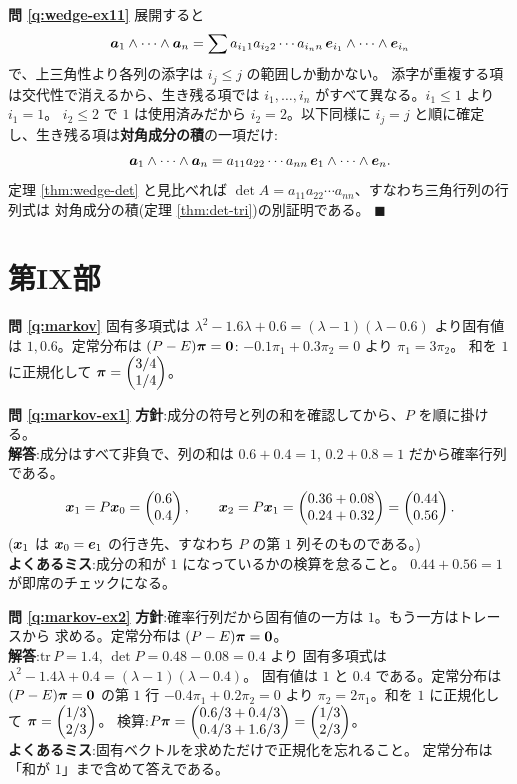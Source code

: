 \bigskip
\noindent\textbf{問 \ref{q:wedge-ex11}}\quad
展開すると
\[
\bm{a}_1 \wedge \cdots \wedge \bm{a}_n
= \sum a_{i_1 1} a_{i_2 2} \cdots a_{i_n n}\,
\bm{e}_{i_1} \wedge \cdots \wedge \bm{e}_{i_n}
\]
で、上三角性より各列の添字は $i_j \le j$ の範囲しか動かない。
添字が重複する項は交代性で消えるから、生き残る項では
$i_1, \dots, i_n$ がすべて異なる。$i_1 \le 1$ より $i_1 = 1$。
$i_2 \le 2$ で $1$ は使用済みだから $i_2 = 2$。以下同様に
$i_j = j$ と順に確定し、生き残る項は\textbf{対角成分の積}の一項だけ:
\[
\bm{a}_1 \wedge \cdots \wedge \bm{a}_n
= a_{11}a_{22}\cdots a_{nn}\,\bm{e}_1 \wedge \cdots \wedge \bm{e}_n.
\]
定理 \ref{thm:wedge-det} と見比べれば
$\det A = a_{11}a_{22}\cdots a_{nn}$、すなわち三角行列の行列式は
対角成分の積(定理 \ref{thm:det-tri})の別証明である。 $\blacksquare$

\section*{第IX部}

\noindent\textbf{問 \ref{q:markov}}\quad
固有多項式は $\lambda^2 - 1.6\lambda + 0.6 = (\lambda - 1)(\lambda - 0.6)$
より固有値は $1, 0.6$。定常分布は $(P - E)\bm{\pi} = \bm{0}$:
$-0.1\pi_1 + 0.3\pi_2 = 0$ より $\pi_1 = 3\pi_2$。
和を $1$ に正規化して $\bm{\pi} = \begin{pmatrix}3/4 \\ 1/4\end{pmatrix}$。

\bigskip
\noindent\textbf{問 \ref{q:markov-ex1}}\quad
\textbf{方針}:成分の符号と列の和を確認してから、$P$ を順に掛ける。\\
\textbf{解答}:成分はすべて非負で、列の和は $0.6 + 0.4 = 1$,
$0.2 + 0.8 = 1$ だから確率行列である。
\[
\bm{x}_1 = P\bm{x}_0 = \begin{pmatrix}0.6 \\ 0.4\end{pmatrix}, \qquad
\bm{x}_2 = P\bm{x}_1
= \begin{pmatrix}0.36 + 0.08 \\ 0.24 + 0.32\end{pmatrix} = \begin{pmatrix}0.44 \\ 0.56\end{pmatrix}.
\]
($\bm{x}_1$ は $\bm{x}_0 = \bm{e}_1$ の行き先、すなわち
$P$ の第 $1$ 列そのものである。)\\
\textbf{よくあるミス}:成分の和が $1$ になっているかの検算を怠ること。
$0.44 + 0.56 = 1$ が即席のチェックになる。

\bigskip
\noindent\textbf{問 \ref{q:markov-ex2}}\quad
\textbf{方針}:確率行列だから固有値の一方は $1$。もう一方はトレースから
求める。定常分布は $(P - E)\bm{\pi} = \bm{0}$。\\
\textbf{解答}:$\mathrm{tr}\,P = 1.4$, $\det P = 0.48 - 0.08 = 0.4$ より
固有多項式は $\lambda^2 - 1.4\lambda + 0.4 = (\lambda - 1)(\lambda - 0.4)$。
固有値は $1$ と $0.4$ である。定常分布は
$(P - E)\bm{\pi} = \bm{0}$ の第 $1$ 行 $-0.4\pi_1 + 0.2\pi_2 = 0$ より
$\pi_2 = 2\pi_1$。和を $1$ に正規化して
$\bm{\pi} = \begin{pmatrix}1/3 \\ 2/3\end{pmatrix}$。
検算:$P\bm{\pi} = \begin{pmatrix}0.6/3 + 0.4/3 \\ 0.4/3 + 1.6/3\end{pmatrix}
= \begin{pmatrix}1/3 \\ 2/3\end{pmatrix}$。\\
\textbf{よくあるミス}:固有ベクトルを求めただけで正規化を忘れること。
定常分布は「和が $1$」まで含めて答えである。

